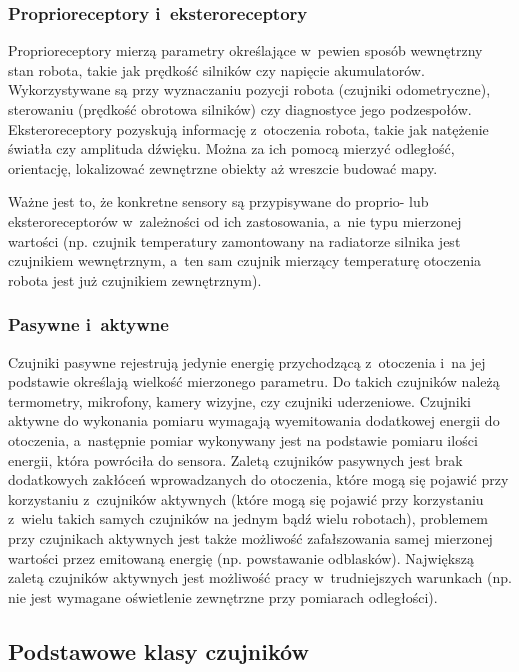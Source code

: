 \subsubsection{Proprioreceptory i~eksteroreceptory}

Proprioreceptory mierzą parametry określające w~pewien sposób wewnętrzny stan
robota, takie jak prędkość silników czy napięcie akumulatorów. Wykorzystywane są
przy wyznaczaniu pozycji robota (czujniki odometryczne), sterowaniu (prędkość
obrotowa silników) czy diagnostyce jego podzespołów. Eksteroreceptory
pozyskują informację z~otoczenia robota, takie jak natężenie
światła czy amplituda dźwięku. Można za ich pomocą mierzyć odległość,
orientację, lokalizować zewnętrzne obiekty aż wreszcie budować mapy.

Ważne jest to, że konkretne sensory są przypisywane do proprio- lub
eksteroreceptorów w~zależności od ich zastosowania, a~nie typu mierzonej
wartości (np. czujnik temperatury zamontowany na radiatorze silnika jest
czujnikiem wewnętrznym, a~ten sam czujnik mierzący temperaturę otoczenia robota
jest już czujnikiem zewnętrznym).

\subsubsection{Pasywne i~aktywne}

Czujniki pasywne rejestrują jedynie energię przychodzącą z~otoczenia i~na
jej podstawie określają wielkość mierzonego parametru. Do takich czujników
należą termometry, mikrofony, kamery wizyjne, czy czujniki uderzeniowe.
Czujniki aktywne do wykonania pomiaru wymagają wyemitowania dodatkowej energii
do otoczenia, a~następnie pomiar wykonywany jest na podstawie pomiaru ilości
energii, która powróciła do sensora. Zaletą czujników pasywnych jest brak
dodatkowych zakłóceń wprowadzanych do otoczenia, które mogą się pojawić
przy korzystaniu z~czujników aktywnych (które mogą się pojawić przy korzystaniu
z~wielu takich samych czujników na jednym bądź wielu robotach), problemem
przy czujnikach aktywnych jest także możliwość zafałszowania samej mierzonej
wartości przez emitowaną energię (np. powstawanie odblasków). Największą zaletą
czujników aktywnych jest możliwość pracy w~trudniejszych warunkach (np. nie
jest wymagane oświetlenie zewnętrzne przy pomiarach odległości).

\subsection{Podstawowe klasy czujników}

